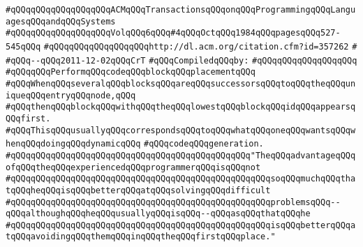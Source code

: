 \verb|#qQQqqQQqqQQqqQQqqQQqACMqQQqTransactionsqQQqonqQQqProgrammingqQQqLanguagesqQQqandqQQqSystems|\newline
\verb|#qQQqqQQqqQQqqQQqqQQqVolqQQq6qQQq#4qQQqOctqQQq1984qQQqpagesqQQq527-545qQQq|\newline
\verb|#qQQqqQQqqQQqqQQqqQQqhttp://dl.acm.org/citation.cfm?id=357262|\newline
\verb|#|\newline
\verb|#qQQq--qQQq2011-12-02qQQqCrT|\newline
\newline
\verb|#qQQqCompiledqQQqby:|\newline
\verb|#qQQqqQQqqQQqqQQqqQQq|\newline
\newline
\newline
\newline
\verb|#qQQqqQQqPerformqQQqcodeqQQqblockqQQqplacementqQQq|\newline
\newline
\verb|#qQQqWhenqQQqseveralqQQqblocksqQQqareqQQqsuccessorsqQQqtoqQQqtheqQQquniqueqQQqentryqQQqnode,qQQq|\newline
\verb|#qQQqthenqQQqblockqQQqwithqQQqtheqQQqlowestqQQqblockqQQqidqQQqappearsqQQqfirst.|\newline
\verb|#qQQqThisqQQqusuallyqQQqcorrespondsqQQqtoqQQqwhatqQQqoneqQQqwantsqQQqwhenqQQqdoingqQQqdynamicqQQq|\newline
\verb|#qQQqcodeqQQqgeneration.|\newline
\newline
\newline
\newline
\verb|#qQQqqQQqqQQqqQQqqQQqqQQqqQQqqQQqqQQqqQQqqQQqqQQq"TheqQQqadvantageqQQqofqQQqtheqQQqexperiencedqQQqprogrammerqQQqisqQQqnot|\newline
\verb|#qQQqqQQqqQQqqQQqqQQqqQQqqQQqqQQqqQQqqQQqqQQqqQQqqQQqsoqQQqmuchqQQqthatqQQqheqQQqisqQQqbetterqQQqatqQQqsolvingqQQqdifficult|\newline
\verb|#qQQqqQQqqQQqqQQqqQQqqQQqqQQqqQQqqQQqqQQqqQQqqQQqqQQqproblemsqQQq--qQQqalthoughqQQqheqQQqusuallyqQQqisqQQq--qQQqasqQQqthatqQQqhe|\newline
\verb|#qQQqqQQqqQQqqQQqqQQqqQQqqQQqqQQqqQQqqQQqqQQqqQQqqQQqisqQQqbetterqQQqatqQQqavoidingqQQqthemqQQqinqQQqtheqQQqfirstqQQqplace."|\newline
\newline
\newline
